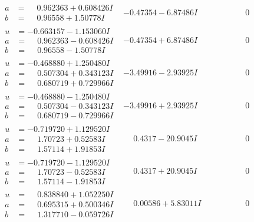 \documentclass[1p]{elsarticle_modified}
\theoremstyle{definition}
\begin{document}
$$\begin{array}{c|c|c}
\begin{aligned}
a &= \phantom{-}0.962363 + 0.608426 I \\
b &= \phantom{-}0.96558 + 1.50778 I\end{aligned}
 & -0.47354 - 6.87486 I & \phantom{-0.000000 } 0 \\ \hline\begin{aligned}
u &= -0.663157 - 1.153060 I \\
a &= \phantom{-}0.962363 - 0.608426 I \\
b &= \phantom{-}0.96558 - 1.50778 I\end{aligned}
 & -0.47354 + 6.87486 I & \phantom{-0.000000 } 0 \\ \hline\begin{aligned}
u &= -0.468880 + 1.250480 I \\
a &= \phantom{-}0.507304 + 0.343123 I \\
b &= \phantom{-}0.680719 + 0.729966 I\end{aligned}
 & -3.49916 - 2.93925 I & \phantom{-0.000000 } 0 \\ \hline\begin{aligned}
u &= -0.468880 - 1.250480 I \\
a &= \phantom{-}0.507304 - 0.343123 I \\
b &= \phantom{-}0.680719 - 0.729966 I\end{aligned}
 & -3.49916 + 2.93925 I & \phantom{-0.000000 } 0 \\ \hline\begin{aligned}
u &= -0.719720 + 1.129520 I \\
a &= \phantom{-}1.70723 + 0.52583 I \\
b &= \phantom{-}1.57114 + 1.91853 I\end{aligned}
 & \phantom{-}0.4317 - 20.9045 I & \phantom{-0.000000 } 0 \\ \hline\begin{aligned}
u &= -0.719720 - 1.129520 I \\
a &= \phantom{-}1.70723 - 0.52583 I \\
b &= \phantom{-}1.57114 - 1.91853 I\end{aligned}
 & \phantom{-}0.4317 + 20.9045 I & \phantom{-0.000000 } 0 \\ \hline\begin{aligned}
u &= \phantom{-}0.838840 + 1.052250 I \\
a &= \phantom{-}0.695315 + 0.500346 I \\
b &= \phantom{-}1.317710 - 0.059726 I\end{aligned}
 & \phantom{-}0.00586 + 5.83011 I & \phantom{-0.000000 } 0 \\ \hline\begin{aligned}

\end{aligned}
\end{array}$$
\end{document}
